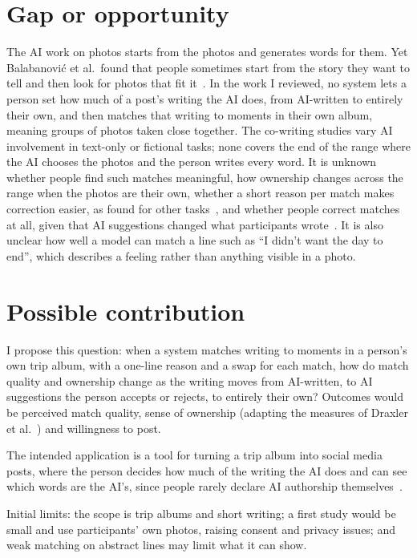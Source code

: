 \documentclass[11pt,a4paper]{article}
\begin{document}
\section{Gap or opportunity}

The AI work on photos starts from the photos and generates words for them. Yet
Balabanović et al.\ found that people sometimes start from the story they want
to tell and then look for photos that fit
it~\cite{balabanovic_storytelling_2000}. In the work I reviewed, no system lets
a person set how much of a post's writing the AI does, from AI-written to
entirely their own, and then matches that writing to moments in their own album,
meaning groups of photos taken close together. The co-writing studies vary AI
involvement in text-only or fictional tasks; none covers the end of the range
where the AI chooses the photos and the person writes every word. It is unknown
whether people find such matches meaningful, how ownership changes across the
range when the photos are their own, whether a short reason per match makes
correction easier, as found for other tasks~\cite{kulesza_principles_2015}, and
whether people correct matches at all, given that AI suggestions changed what
participants wrote~\cite{jakesch_co-writing_2023}. It
is also unclear how well a model can match a line such as ``I didn't want the
day to end'', which describes a feeling rather than anything visible in a photo.

\section{Possible contribution}

I propose this question: when a system matches writing to moments in a
person's own trip album, with a one-line reason and a swap for each match, how
do match quality and ownership change as the writing moves from AI-written, to
AI suggestions the person accepts or rejects, to entirely their own? Outcomes
would be perceived match quality, sense of ownership (adapting the measures of
Draxler et al.~\cite{draxler_ai_2024}) and willingness to post.

The intended application is a tool for turning a trip album into social media
posts, where the person decides how much of the writing the AI does and can see
which words are the AI's, since people rarely declare AI authorship
themselves~\cite{draxler_ai_2024}.

Initial limits: the scope is trip albums and short writing; a first study would
be small and use participants' own photos, raising consent and privacy issues;
and weak matching on abstract lines may limit what it can show.



\end{document}
